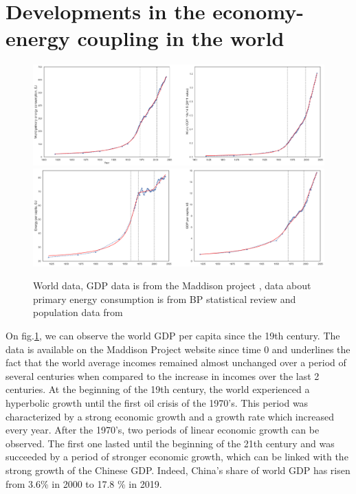 \documentclass[conference]{IEEEtran}
\begin{document}
\section{Developments in the economy-energy coupling in the world}
\begin{figure}
    \centering
    \includegraphics[scale=0.25]{world.png}
    \includegraphics[scale=0.25]{world-percapita.png}
    \caption{World data, GDP data is from the Maddison project \cite{bolt_maddison_2020}, data about primary energy consumption is from BP statistical review \cite{noauthor_statistical_nodate} and population data from \cite{noauthor_history_2020}}
    \label{fig:worlddata}
\end{figure}
On fig.\ref{fig:worlddata}, we can observe the world GDP per capita since the 19th century. The data is available on the Maddison Project website since time 0 and underlines the fact that the world average incomes remained almost unchanged over a period of several centuries when compared to the increase in incomes over the last 2 centuries. At the beginning of the 19th century, the world experienced a hyperbolic growth until the first oil crisis of the 1970’s. This period was characterized by a strong economic growth and a growth rate which increased every year. 
After the 1970’s, two periods of linear economic growth can be observed. The first one lasted until the beginning of the 21th century and was succeeded by a period of stronger economic growth, which can be linked with the strong growth of the Chinese GDP. Indeed, China's share of world GDP has risen from 3.6\% in 2000 to 17.8 \% in 2019. 
\\
\end{document}
